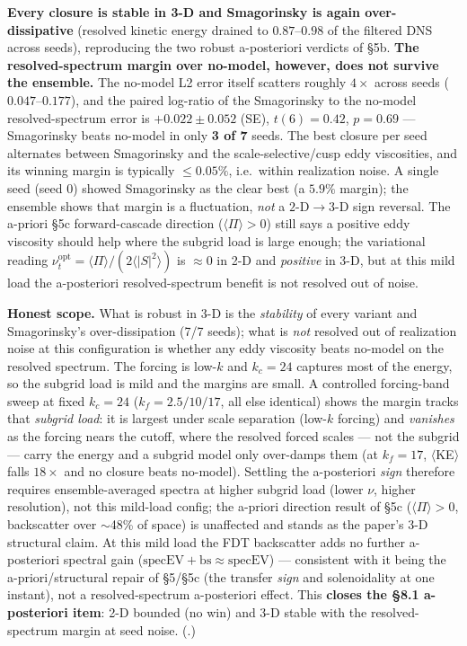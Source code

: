 \documentclass[11pt]{article}
\begin{document}
\textbf{Every closure is stable in 3-D and Smagorinsky is again over-dissipative} (resolved kinetic energy drained to $0.87$--$0.98$ of the filtered DNS across seeds), reproducing the two robust a-posteriori verdicts of §5b. \textbf{The resolved-spectrum margin over no-model, however, does not survive the ensemble.} The no-model L2 error itself scatters roughly $4\times$ across seeds ($0.047$--$0.177$), and the paired log-ratio of the Smagorinsky to the no-model resolved-spectrum error is $+0.022\pm 0.052$ (SE), $t(6)=0.42$, $p=0.69$ --- Smagorinsky beats no-model in only \textbf{3 of 7} seeds. The best closure per seed alternates between Smagorinsky and the scale-selective/cusp eddy viscosities, and its winning margin is typically $\le 0.05\%$, i.e.\ within realization noise. A single seed (seed 0) showed Smagorinsky as the clear best (a $5.9\%$ margin); the ensemble shows that margin is a fluctuation, \emph{not} a $2\text{-D}\!\to\!3\text{-D}$ sign reversal. The a-priori §5c forward-cascade direction ($\langle \Pi \rangle >0$) still says a positive eddy viscosity should help where the subgrid load is large enough; the variational reading $\nu _{t}^{\mathrm{opt}}=\langle \Pi \rangle /(2\langle |S|^{2}\rangle )$ is $\approx 0$ in 2-D and \emph{positive} in 3-D, but at this mild load the a-posteriori resolved-spectrum benefit is not resolved out of noise.


\textbf{Honest scope.} What is robust in 3-D is the \emph{stability} of every variant and Smagorinsky's over-dissipation (7/7 seeds); what is \emph{not} resolved out of realization noise at this configuration is whether any eddy viscosity beats no-model on the resolved spectrum. The forcing is low-$k$ and $k_{c}=24$ captures most of the energy, so the subgrid load is mild and the margins are small. A controlled forcing-band sweep at fixed $k_{c}=24$ ($k_{f}=2.5/10/17$, all else identical) shows the margin tracks that \emph{subgrid load}: it is largest under scale separation (low-$k$ forcing) and \emph{vanishes} as the forcing nears the cutoff, where the resolved forced scales --- not the subgrid --- carry the energy and a subgrid model only over-damps them (at $k_{f}=17$, $\langle$KE$\rangle$ falls $18\times$ and no closure beats no-model). Settling the a-posteriori \emph{sign} therefore requires ensemble-averaged spectra at higher subgrid load (lower $\nu$, higher resolution), not this mild-load config; the a-priori direction result of §5c ($\langle \Pi \rangle >0$, backscatter over $\sim $48\% of space) is unaffected and stands as the paper's 3-D structural claim. At this mild load the FDT backscatter adds no further a-posteriori spectral gain ($\mathrm{specEV{+}bs}\approx \mathrm{specEV}$) --- consistent with it being the a-priori/structural repair of §5/§5c (the transfer \emph{sign} and solenoidality at one instant), not a resolved-spectrum a-posteriori effect. This \textbf{closes the §8.1 a-posteriori item}: 2-D bounded (no win) and 3-D stable with the resolved-spectrum margin at seed noise. (.)
\end{document}
